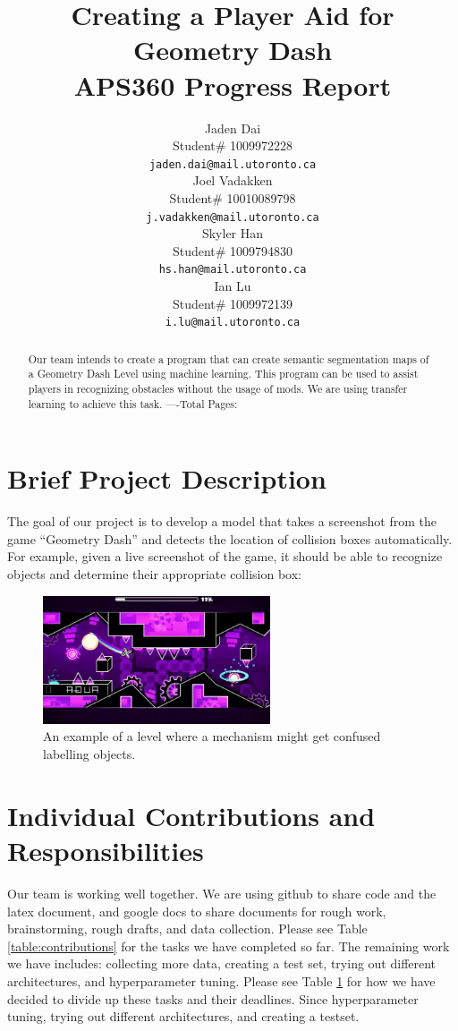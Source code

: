 \documentclass{article} %
\title{Creating a Player Aid for Geometry Dash  \\ 
APS360 Progress Report}
\author{Jaden Dai \\
Student\# 1009972228\\
\texttt{jaden.dai@mail.utoronto.ca} \\
\And
Joel Vadakken  \\
Student\# 10010089798\\
\texttt{j.vadakken@mail.utoronto.ca} \\
\And
Skyler Han  \\
Student\# 1009794830 \\
\texttt{hs.han@mail.utoronto.ca} \\
\AND
Ian Lu  \\
Student\# 1009972139 \\
\texttt{i.lu@mail.utoronto.ca} \\
\AND
}
\begin{document}
\maketitle

\begin{abstract}
Our team intends to create a program that can create semantic segmentation
maps of a Geometry Dash Level using machine learning. This program can be
used to assist players in recognizing obstacles without the usage of mods.
We are using transfer learning to achieve this task.
----Total Pages: \pageref{last_page}
\end{abstract}



\section{Brief Project Description}


The goal of our project is to develop a model that takes a screenshot from the game “Geometry Dash” and detects the location of collision boxes automatically. For example, given a live screenshot of the game, it should be able to recognize objects and determine their appropriate collision box:


\begin{figure}[!h]
\begin{center}
\includegraphics[width=0.6\textwidth]{Figs/example_confusing_image.png}
\end{center}
\caption{An example of a level where a mechanism might get confused labelling objects.}
\label{fig:Confusion_example}
\end{figure}
 

\section{Individual Contributions and Responsibilities}
\label{gen_inst}

Our team is working well together. We are using github to share code and the latex document, and google docs to share documents for rough work, brainstorming, rough drafts, and data collection. Please see Table \ref{table:contributions} for the tasks we have completed so far. The remaining work we have includes: collecting more data, creating a test set, trying out different architectures, and hyperparameter tuning.  Please see Table \ref{} for how we have decided to divide up these tasks and their deadlines. Since hyperparameter tuning, trying out different architectures, and creating a testset. 
\end{document}
